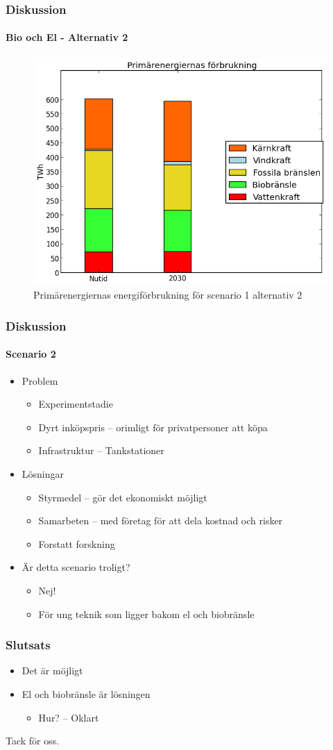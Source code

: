 \documentclass{beamer}
\begin{document}
\begin{frame}
	\frametitle{Diskussion}
	\framesubtitle{Bio och El - Alternativ 2}
	\begin{figure}[h!]
       \centering
       \includegraphics[scale=0.5]{scen1a2energidiagram.png}
       \caption{Primärenergiernas energiförbrukning för scenario 1 alternativ 2}
       \label{fig:scen1a1energidiagram}
	\end{figure}
\end{frame}

\begin{frame}
	\frametitle{Diskussion}
	\framesubtitle{Scenario 2}
	\begin{itemize}
		\item Problem
			\begin{itemize}
				\item Experimentstadie
				\item Dyrt inköpspris -- orimligt för privatpersoner att köpa
				\item Infrastruktur -- Tankstationer
			\end{itemize}
		\pause
		\item Lösningar
			\begin{itemize}
				\item Styrmedel -- gör det ekonomiskt möjligt
				\item Samarbeten -- med företag för att dela kostnad och risker
				\item Forstatt forskning
			\end{itemize}
		\pause
		\item Är detta scenario troligt?
			\begin{itemize}
				\item Nej!
				\item För ung teknik som ligger bakom el och biobränsle
			\end{itemize}
	\end{itemize}
\end{frame}

\begin{frame}
	\frametitle{Slutsats}
	\begin{itemize}
		\item Det är möjligt
		\item El och biobränsle är lösningen
			\begin{itemize}
				\item Hur? -- Oklart
			\end{itemize}
	\end{itemize}
	\vfill
	\pause
	Tack för oss.
\end{frame}
\end{document}
